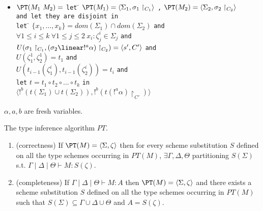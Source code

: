 \begin{table*}
\begin{center}
{{\begin{minipage}{.9\textwidth}
\begin{itemize}
\begin{tabbing}
    \>\>\>\> \texttt{else}\\
    \>\>\>\>\> $\langle !^{a}\Sigma', !^a(\tau\linear \sigma)\restriction_{C\cup C'} \rangle$
  \end{tabbing}
\item \begin{tabbing}
   $\PT(M_1\ M_2)=$ \= \texttt{let} \=
     $\PT(M_1) = \langle \Sigma_1, \sigma_1\restriction_{C_1} \rangle$ \texttt{,}
     $\PT(M_2) = \langle \Sigma_2, \sigma_2\restriction_{C_2}\rangle$ \\
 \>\>   \texttt{and let they are disjoint in}\\
 \>\> \texttt{let} \= $\{x_1,\ldots,x_k\} = dom(\Sigma_1)\cap
dom(\Sigma_2)$ \texttt{and} \\
\>\>\> $\forall 1\le i\le k\ \forall 1\le j\le 2\
x_i:\zeta_j^i\in\Sigma_j$ \texttt{and}\\
\>\>\> $U(\sigma_1\restriction_{C_1},(\sigma_2\linear!^{a}\alpha)\restriction_{C_2}) = \langle s',C'\rangle$
\texttt{and}\\
\>\>\> $U(\zeta_1^1,\zeta_2^1) = t_{1}$ \texttt{and}\\
\>\>\> $U(t_{i-1}(\zeta_1^i),t_{i-1}(\zeta_2^i)) = t_{i}$ \texttt{and} \\
\>\>\>\texttt{let} $t=t_{1}\circ t_{2}\circ...\circ t_{k}$ \texttt{in}\\
\>\>\>$\langle !^{b}(t(\Sigma_{1})\cup t(\Sigma_{2})), !^{b}(t(!^{a}\alpha)\restriction_{C'})\rangle$
  \end{tabbing}
\end{itemize}
$\alpha, a,b$ are fresh variables.
\end{minipage}
}}
\caption{The type inference algorithm $\mathit{PT}$.} \label{table-def-type-inf}
\end{center}
\end{table*}





\begin{thm}[Type Inference]\hfill 
\begin{enumerate}[\em i)] 
\item (correctness) If $\PT(M) = \langle \Sigma, \zeta\rangle$ then
for every scheme substitution
$S$ defined on all the type schemes occurring in $PT(M)$, $\exists \Gamma,\Delta,\Theta$ partitioning
$S(\Sigma)$ s.t. $\Gamma \mid \Delta \mid \Theta \vdash M: S(\zeta)$.
\item (completeness)  If $\Gamma \mid \Delta \mid \Theta \vdash M: A$ then
 $\PT(M)=\langle \Sigma,\zeta\rangle $ and there exists a scheme
 substitution $S$ defined on all the type schemes occurring in $PT(M)$ such that 
 $S(\Sigma) \subseteq \Gamma \cup \Delta \cup \Theta $ and $A=S(\zeta)$.
\end{enumerate} 
\end{thm}  

